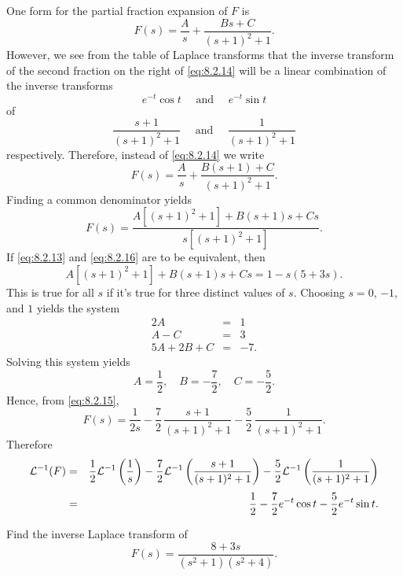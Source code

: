 \begin{examplesolution}
\solution One form for the partial fraction expansion of $F$ is
\begin{equation}
  \label{eq:8.2.14}F(s)=\frac{A}{s}+\frac{Bs+C}{(s+1)^{2}+1}.
\end{equation}
However, we see from the table of Laplace transforms that the inverse transform of the second
fraction on the right of \eqref{eq:8.2.14} will be a linear combination of the inverse transforms
\[
  e^{-t}\cos t\quad\mbox{ and }\quad e^{-t}\sin t
\]
of
\[
  \frac{s+1}{(s+1)^{2}+1}\quad\mbox{ and }\quad\frac{1}{(s+1)^{2}+1}
\]
respectively. Therefore, instead of \eqref{eq:8.2.14} we write
\begin{equation}
  \label{eq:8.2.15}F(s)=\frac{A}{s}+\frac{B(s+1)+C}{(s+1)^{2}+1}.
\end{equation}
Finding a common denominator yields
\begin{equation}
  \label{eq:8.2.16}F(s)=\frac{A\left[(s+1)^{2}+1\right]+B(s+1)s+Cs}{s\left[(s+1)^{2}+1\right]}.
\end{equation}
If \eqref{eq:8.2.13} and \eqref{eq:8.2.16} are to be equivalent, then
\[
  A\left[(s+1)^{2}+1\right]+B(s+1)s+Cs=1-s(5+3s).
\]
This is true for all $s$ if it's true for three distinct values of $s$. Choosing $s=0$, $-1$, and
$1$ yields the system
\[
  \begin{array}{rcr}
    2A      & = & 1\phantom{.} \\
    A-C     & = & 3\phantom{.} \\
    5A+2B+C & = & -7.
  \end{array}
\]
Solving this system yields
\[
  A=\frac{1}{2},\quad B=-\frac{7}{2},\quad C=-\frac{5}{2}.
\]
Hence, from \eqref{eq:8.2.15},
\[
  F(s)=\frac{1}{2s}-\frac{7}{2}\,\frac{s+1}{(s+1)^{2}+1}- \frac{5}{2}\,\frac{1}{(s+1)^{2}+1}.
\]
Therefore
\begin{eqnarray*}
  {\cal L}^{-1}(F) & = & \frac{1}{2}{\cal L}^{-1}\left(\frac{1}{s}\right)-\frac{7}{2}{\cal L}^{-1}\left(\frac{s+1}{(s+1)^{2}+1}\right)-\frac{5}{2}{\cal L}^{-1}\left(\frac{1}{(s+1)^{2}+1}\right) \\[1\jot]
                   & = & \frac{1}{2}-\frac{7}{2}e^{-t}\cos t-\frac{5}{2}e^{-t}\sin t.
\end{eqnarray*}
\end{examplesolution}

\begin{example}
  \label{example:8.2.9}\rm Find the inverse Laplace transform of
  \begin{equation}
    \label{eq:8.2.17}F(s)=\frac{8+3s}{(s^{2}+1)(s^{2}+4)}.
  \end{equation}
\end{example}

